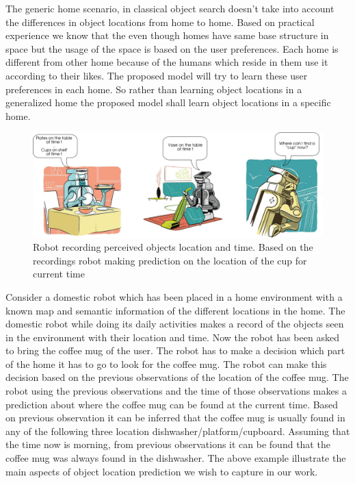 The generic home scenario, in classical object search doesn't take into account the differences in object locations from home to home. Based on practical experience we know that the even though homes have same base structure in space but the usage of the space is based on the user preferences. Each home is different from other home because of the humans which reside in them use it according to their likes. The proposed model will try to learn these user preferences in each home. So rather than learning object locations in a generalized home the proposed model shall learn object locations in a specific home.




\begin{figure}[htp]
\centering
\includegraphics[scale=0.4]{pictures/scenario.png}
\caption{Robot recording perceived objects location and time. Based on the
recordings robot making prediction on the location of the cup for current time \protect\footnotemark }
\label{scenario}
\end{figure}
Consider a domestic robot which has been placed in a home environment with a known map
and semantic information of the different locations in the home. The domestic robot while doing its daily activities 
makes a record of the objects seen in the environment with
their location and time. Now the robot has been asked to bring the coffee mug
of the user.
The robot has to make a decision which part of the home it has to go to look for
the coffee mug.
The robot can make this decision based on the previous observations of the 
location of the coffee mug.
The robot using the previous observations and the time of those observations 
makes a prediction about where the coffee mug can be found at the current time.
Based on previous observation it can be
inferred that the coffee mug is usually found in any of the following three location
dishwasher/platform/cupboard. Assuming that the time now is morning, from
previous observations it can be found that the coffee mug was always found  in the
dishwasher. The above example illustrate the main aspects of object location
prediction we wish to capture in our work.


